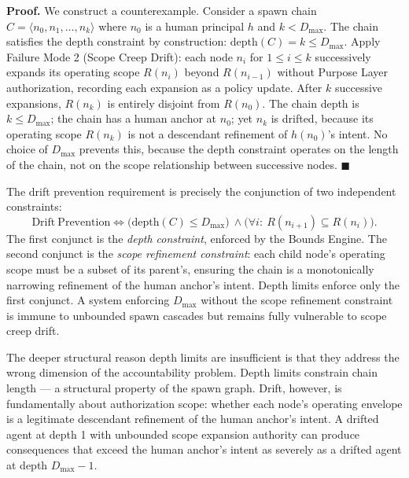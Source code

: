 \medskip
\noindent\textbf{Proof.} We construct a counterexample. Consider a spawn chain $C = \langle n_0, n_1, \ldots, n_k \rangle$ where $n_0$ is a human principal $h$ and $k < D_{\max}$. The chain satisfies the depth constraint by construction: $\mathrm{depth}(C) = k \leq D_{\max}$. Apply Failure Mode 2 (Scope Creep Drift): each node $n_i$ for $1 \leq i \leq k$ successively expands its operating scope $R(n_i)$ beyond $R(n_{i-1})$ without Purpose Layer authorization, recording each expansion as a policy update. After $k$ successive expansions, $R(n_k)$ is entirely disjoint from $R(n_0)$. The chain depth is $k \leq D_{\max}$; the chain has a human anchor at $n_0$; yet $n_k$ is drifted, because its operating scope $R(n_k)$ is not a descendant refinement of $h(n_0)$'s intent. No choice of $D_{\max}$ prevents this, because the depth constraint operates on the length of the chain, not on the scope relationship between successive nodes. $\blacksquare$

The drift prevention requirement is precisely the conjunction of two independent constraints:
\begin{equation}
\mathrm{Drift\ Prevention} \iff \bigl( \mathrm{depth}(C) \leq D_{\max} \bigr)\ \land \bigl( \forall i:\ R(n_{i+1}) \subseteq R(n_i) \bigr).
\label{eq:rs-drift-prevention-constraint}
\end{equation}
The first conjunct is the \emph{depth constraint}, enforced by the Bounds Engine. The second conjunct is the \emph{scope refinement constraint}: each child node's operating scope must be a subset of its parent's, ensuring the chain is a monotonically narrowing refinement of the human anchor's intent. Depth limits enforce only the first conjunct. A system enforcing $D_{\max}$ without the scope refinement constraint is immune to unbounded spawn cascades but remains fully vulnerable to scope creep drift.

The deeper structural reason depth limits are insufficient is that they address the wrong dimension of the accountability problem. Depth limits constrain chain length — a structural property of the spawn graph. Drift, however, is fundamentally about authorization scope: whether each node's operating envelope is a legitimate descendant refinement of the human anchor's intent. A drifted agent at depth 1 with unbounded scope expansion authority can produce consequences that exceed the human anchor's intent as severely as a drifted agent at depth $D_{\max} - 1$.

